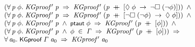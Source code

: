 \documentclass[letterpaper]{article}
\renewcommand{\HOLConst}[1]{{\textsf{\upshape\small #1}}}
\newenvironment{holmath}{\begin{displaymath}\begin{array}{l}}{\end{array}\end{displaymath}\ignorespacesafterend}
\begin{document}
\begin{holmath}
\;\;\;\;\;(\HOLSymConst{\HOLTokenForall{}}\HOLBoundVar{p}\;\HOLBoundVar{\ensuremath{\phi}}.\;\HOLFreeVar{KGproof\sp{\prime}}\;\HOLBoundVar{p}\;\HOLSymConst{\HOLTokenImp{}}\;\HOLFreeVar{KGproof\sp{\prime}}\;(\HOLBoundVar{p}\;\HOLSymConst{\HOLTokenDoublePlus}\;[\HOLSymConst{\ensuremath{\Diamond}}\;\HOLBoundVar{\ensuremath{\phi}}\;\HOLSymConst{\ensuremath{\rightarrow}}\;\HOLSymConst{\HOLTokenNeg{}}\HOLSymConst{\ensuremath{\Box}}\;(\HOLSymConst{\HOLTokenNeg{}}\HOLBoundVar{\ensuremath{\phi}})]))\;\HOLSymConst{\HOLTokenConj{}}\\
\;\;\;\;\;(\HOLSymConst{\HOLTokenForall{}}\HOLBoundVar{p}\;\HOLBoundVar{\ensuremath{\phi}}.\;\HOLFreeVar{KGproof\sp{\prime}}\;\HOLBoundVar{p}\;\HOLSymConst{\HOLTokenImp{}}\;\HOLFreeVar{KGproof\sp{\prime}}\;(\HOLBoundVar{p}\;\HOLSymConst{\HOLTokenDoublePlus}\;[\HOLSymConst{\HOLTokenNeg{}}\HOLSymConst{\ensuremath{\Box}}\;(\HOLSymConst{\HOLTokenNeg{}}\HOLBoundVar{\ensuremath{\phi}})\;\HOLSymConst{\ensuremath{\rightarrow}}\;\HOLSymConst{\ensuremath{\Diamond}}\;\HOLBoundVar{\ensuremath{\phi}}]))\;\HOLSymConst{\HOLTokenConj{}}\\
\;\;\;\;\;(\HOLSymConst{\HOLTokenForall{}}\HOLBoundVar{p}\;\HOLBoundVar{\ensuremath{\phi}}.\;\HOLFreeVar{KGproof\sp{\prime}}\;\HOLBoundVar{p}\;\HOLSymConst{\HOLTokenConj{}}\;\HOLConst{ptaut}\;\HOLBoundVar{\ensuremath{\phi}}\;\HOLSymConst{\HOLTokenImp{}}\;\HOLFreeVar{KGproof\sp{\prime}}\;(\HOLBoundVar{p}\;\HOLSymConst{\HOLTokenDoublePlus}\;[\HOLBoundVar{\ensuremath{\phi}}]))\;\HOLSymConst{\HOLTokenConj{}}\\
\;\;\;\;\;(\HOLSymConst{\HOLTokenForall{}}\HOLBoundVar{p}\;\HOLBoundVar{\ensuremath{\phi}}.\;\HOLFreeVar{KGproof\sp{\prime}}\;\HOLBoundVar{p}\;\HOLSymConst{\HOLTokenConj{}}\;\HOLBoundVar{\ensuremath{\phi}}\;\HOLSymConst{\HOLTokenIn{}}\;\HOLFreeVar{\ensuremath{\Gamma}}\;\HOLSymConst{\HOLTokenImp{}}\;\HOLFreeVar{KGproof\sp{\prime}}\;(\HOLBoundVar{p}\;\HOLSymConst{\HOLTokenDoublePlus}\;[\HOLBoundVar{\ensuremath{\phi}}]))\;\HOLSymConst{\HOLTokenImp{}}\\
\;\;\;\;\;\HOLSymConst{\HOLTokenForall{}}\HOLBoundVar{a\sb{\mathrm{0}}}.\;\HOLConst{KGproof}\;\HOLFreeVar{\ensuremath{\Gamma}}\;\HOLBoundVar{a\sb{\mathrm{0}}}\;\HOLSymConst{\HOLTokenImp{}}\;\HOLFreeVar{KGproof\sp{\prime}}\;\HOLBoundVar{a\sb{\mathrm{0}}}
\end{holmath}
\end{document}
